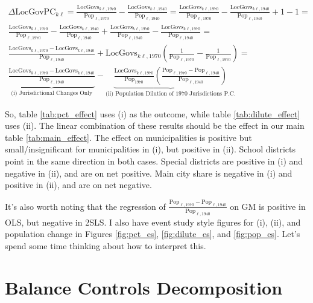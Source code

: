 \documentclass{article}
\begin{document}
\begin{align*}
	\Delta\text{LocGovPC}_{k\ell} = \frac{\text{LocGovs}_{k\ell,1970}}{\text{Pop}_{\ell,1970}} - \frac{\text{LocGovs}_{k\ell,1940}}{\text{Pop}_{\ell,1940}} = \frac{\text{LocGovs}_{k\ell,1970}}{\text{Pop}_{\ell,1970}} - \frac{\text{LocGovs}_{k\ell,1940}}{\text{Pop}_{\ell,1940}} +1 - 1 = \\
\frac{\text{LocGovs}_{k\ell,1970}}{\text{Pop}_{\ell,1970}} - \frac{\text{LocGovs}_{k\ell,1940}}{\text{Pop}_{\ell,1940}} + \frac{\text{LocGovs}_{k\ell,1970}}{\text{Pop}_{\ell,1940}} - \frac{\text{LocGovs}_{k\ell,1970}}{\text{Pop}_{\ell,1940}} = \\
 \frac{\text{LocGovs}_{k\ell,1970} - \text{LocGovs}_{k\ell,1940}}{\text{Pop}_{\ell,1940}} + \text{LocGovs}_{k\ell,1970} \left(\frac{1}{\text{Pop}_{\ell,1970}} - \frac{1}{\text{Pop}_{\ell,1970}} \right) = \\
\underbrace{\frac{\text{LocGovs}_{k\ell,1970} - \text{LocGovs}_{k\ell,1940}}{\text{Pop}_{\ell,1940}}}_{\text{(i) Jurisdictional Changes Only}} - \underbrace{\frac{\text{LocGovs}_{k\ell,1970}}{\text{Pop}_{1970}} \left(\frac{\text{Pop}_{\ell,1970} - \text{Pop}_{\ell,1940}}{\text{Pop}_{\ell,1940}} \right)}_{\text{(ii) Population Dilution of 1970 Jurisdictions P.C.}} 
\end{align*}

So, table \ref{tab:pct_effect} uses (i) as the outcome, while table \ref{tab:dilute_effect} uses (ii). The linear combination of these results should be the effect in our main table \ref{tab:main_effect}. The effect on municipalities is positive but small/insignificant for municipalities in (i), but positive in (ii). School districts point in the same direction in both cases. Special districts are positive in (i) and negative in (ii), and are on net positive. Main city share is negative in (i) and positive in (ii), and are on net negative. 

It's also worth noting that the regression of $\frac{\text{Pop}_{\ell,1970} - \text{Pop}_{\ell,1940}}{\text{Pop}_{\ell,1940}}$ on GM is positive in OLS, but negative in 2SLS. I also have event study style figures for (i), (ii), and population change in Figures \ref{fig:pct_es}, \ref{fig:dilute_es}, and \ref{fig:pop_es}. Let's spend some time thinking about how to interpret this. 

\section{Balance Controls Decomposition}
\end{document}
